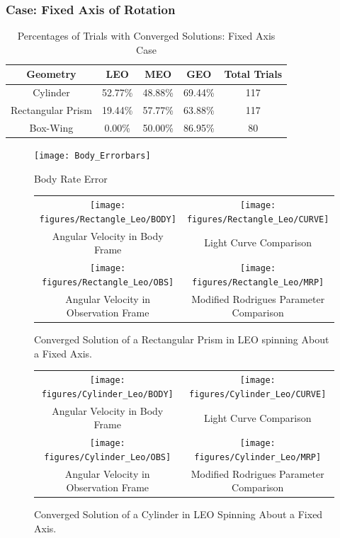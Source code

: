 \subsubsection{Case: Fixed Axis of Rotation}

\begin{table}[ht]
	\begin{center}
		\begin{tabular}{| c | c | c | c | c |}
			\hline Geometry & LEO & MEO & GEO & Total Trials\\ 
			\hline Cylinder & 52.77\% & 48.88\% & 69.44\% & 117 \\
			\hline Rectangular Prism & 19.44\% & 57.77\% & 63.88\% & 117\\
			\hline Box-Wing & 0.00\% & 50.00\% & 86.95\% & 80\\
			\hline
		\end{tabular}
	\end{center}
	\caption{Percentages of Trials with Converged Solutions: Fixed Axis Case}
\end{table}

\begin{figure}[ht]
	\begin{center}
		\texttt{[image: Body\_Errorbars]}
		\caption{Body Rate Error}
	\end{center}
\end{figure}

\begin{figure}
	\begin{tabular}{cc}
		\texttt{[image: figures/Rectangle\_Leo/BODY]} &
		\texttt{[image: figures/Rectangle\_Leo/CURVE]} \\
		Angular Velocity in Body Frame & Light Curve Comparison \\
		\texttt{[image: figures/Rectangle\_Leo/OBS]} &
		\texttt{[image: figures/Rectangle\_Leo/MRP]} \\
		Angular Velocity in Observation Frame & Modified Rodrigues Parameter Comparison
	\end{tabular}
	\caption{Converged Solution of a Rectangular Prism in LEO spinning About a Fixed Axis.}
\end{figure}


\begin{figure}
	\begin{tabular}{cc}
		\texttt{[image: figures/Cylinder\_Leo/BODY]} &
		\texttt{[image: figures/Cylinder\_Leo/CURVE]} \\
		Angular Velocity in Body Frame & Light Curve Comparison \\
		\texttt{[image: figures/Cylinder\_Leo/OBS]} &
		\texttt{[image: figures/Cylinder\_Leo/MRP]} \\
		Angular Velocity in Observation Frame & Modified Rodrigues Parameter Comparison
	\end{tabular}
	\caption{Converged Solution of a Cylinder in LEO Spinning About a Fixed Axis.}
\end{figure}

